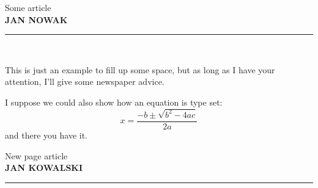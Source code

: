 \documentclass{article}
\date{\today}
\renewcommand{\byline}[2]{\begin {center} \bylinestyle #1 \\{\footnotesize \bf \MakeUppercase {#2}} \\ \rule [3pt]{0.4\hsize}{0.5pt}\\ \end {center} \par}
\begin{document}
\maketitle

\begin{multicols}{2}

\byline{Some article}{Jan Nowak}
    \lipsum[1]
\closearticle


This is just an example to fill up some space, but as long as I have your attention, I'll give some newspaper advice.

I suppose we could also show how an equation is type set:
\begin{displaymath}
x=\frac{-b\pm\sqrt{b^2-4ac}}{2a}
\end{displaymath}
and there you have it.  

\lipsum[1-4]

\closearticle

\byline{New page article}{Jan Kowalski}
    \lipsum[1-4]
\closearticle

\end{multicols}
\end{document}

